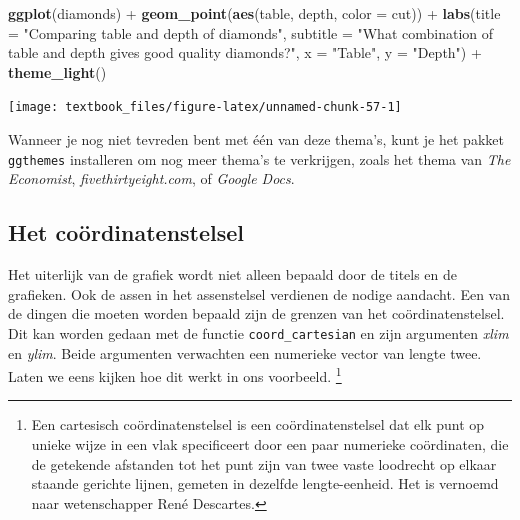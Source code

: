 \documentclass[]{tufte-book}
\newenvironment{Shaded}{}{}
\newcommand{\DataTypeTok}[1]{\textcolor[rgb]{0.56,0.13,0.00}{#1}}
\newcommand{\KeywordTok}[1]{\textcolor[rgb]{0.00,0.44,0.13}{\textbf{#1}}}
\newcommand{\NormalTok}[1]{#1}
\newcommand{\OperatorTok}[1]{\textcolor[rgb]{0.40,0.40,0.40}{#1}}
\newcommand{\StringTok}[1]{\textcolor[rgb]{0.25,0.44,0.63}{#1}}
\begin{document}
\begin{Shaded}
\begin{Highlighting}[]
\KeywordTok{ggplot}\NormalTok{(diamonds) }\OperatorTok{+}
\StringTok{    }\KeywordTok{geom_point}\NormalTok{(}\KeywordTok{aes}\NormalTok{(table, depth, }\DataTypeTok{color =}\NormalTok{ cut)) }\OperatorTok{+}\StringTok{ }
\StringTok{    }\KeywordTok{labs}\NormalTok{(}\DataTypeTok{title =} \StringTok{"Comparing table and depth of diamonds"}\NormalTok{,}
         \DataTypeTok{subtitle =} \StringTok{"What combination of table and depth gives good quality diamonds?"}\NormalTok{,}
         \DataTypeTok{x =} \StringTok{"Table"}\NormalTok{,}
         \DataTypeTok{y =} \StringTok{"Depth"}\NormalTok{) }\OperatorTok{+}
\StringTok{    }\KeywordTok{theme_light}\NormalTok{()}
\end{Highlighting}
\end{Shaded}

\texttt{[image: textbook\_files/figure-latex/unnamed-chunk-57-1]}

Wanneer je nog niet tevreden bent met één van deze thema's, kunt je het pakket \texttt{ggthemes} installeren om nog meer thema's te verkrijgen, zoals het thema van \emph{The Economist}, \emph{fivethirtyeight.com}, of \emph{Google Docs}.

\hypertarget{het-couxf6rdinatenstelsel}{%
\subsection{Het coördinatenstelsel}\label{het-couxf6rdinatenstelsel}}

Het uiterlijk van de grafiek wordt niet alleen bepaald door de titels en de grafieken. Ook de assen in het assenstelsel verdienen de nodige aandacht. Een van de dingen die moeten worden bepaald zijn de grenzen van het coördinatenstelsel. Dit kan worden gedaan met de functie \texttt{coord\_cartesian} en zijn argumenten \emph{xlim} en \emph{ylim}. Beide argumenten verwachten een numerieke vector van lengte twee. Laten we eens kijken hoe dit werkt in ons voorbeeld. \footnote{Een cartesisch coördinatenstelsel is een coördinatenstelsel dat elk punt op unieke wijze in een vlak specificeert door een paar numerieke coördinaten, die de getekende afstanden tot het punt zijn van twee vaste loodrecht op elkaar staande gerichte lijnen, gemeten in dezelfde lengte-eenheid. Het is vernoemd naar wetenschapper René Descartes.}
\end{document}
